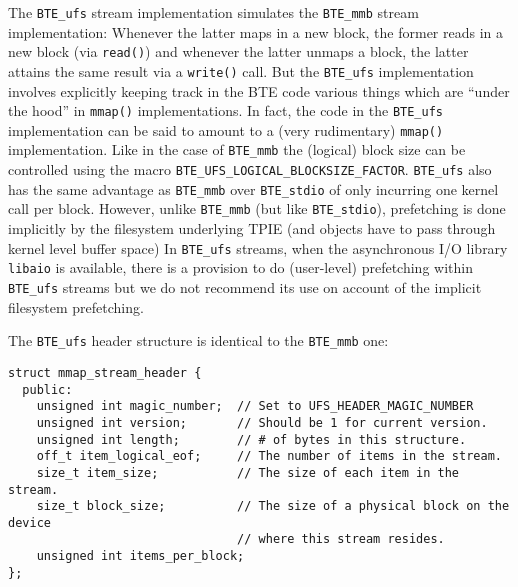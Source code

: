 The \verb|BTE_ufs| stream implementation simulates the \verb|BTE_mmb|
stream implementation: Whenever the latter maps in a new block, the former
reads in a new block (via \verb|read()|) and whenever the latter unmaps a
block, the latter attains the same result via a \verb|write()| call. But
the \verb|BTE_ufs| implementation involves explicitly keeping track in the
BTE code various things which are ``under the hood'' in \verb|mmap()|
implementations. In fact, the code in the
\verb|BTE_ufs| implementation can be said to amount to a (very rudimentary)
\verb|mmap()| implementation. Like in the case of \verb|BTE_mmb| the
(logical) block size can be controlled using the macro
\verb|BTE_UFS_LOGICAL_BLOCKSIZE_FACTOR|. \verb|BTE_ufs| also has the same
advantage as \verb|BTE_mmb| over \verb|BTE_stdio| of only incurring one
kernel call per block. However, unlike \verb|BTE_mmb| (but like
\verb|BTE_stdio|), prefetching is done implicitly by the filesystem
underlying TPIE (and objects have to pass through kernel level buffer
space)
In \verb|BTE_ufs| streams, when the asynchronous I/O library
\verb|libaio| is available,
there is a provision to do (user-level) prefetching within \verb|BTE_ufs|
streams but we do not recommend its use on account of the implicit
filesystem prefetching.

The \verb|BTE_ufs| header structure is identical to the \verb|BTE_mmb| one:
\begin{verbatim}
struct mmap_stream_header { 
  public:
    unsigned int magic_number;  // Set to UFS_HEADER_MAGIC_NUMBER
    unsigned int version;       // Should be 1 for current version.
    unsigned int length;        // # of bytes in this structure.
    off_t item_logical_eof;     // The number of items in the stream.
    size_t item_size;           // The size of each item in the stream.
    size_t block_size;          // The size of a physical block on the device
                                // where this stream resides.
    unsigned int items_per_block;
};
\end{verbatim}

